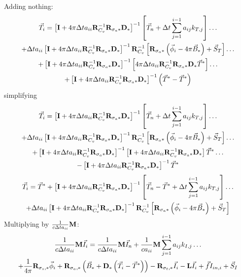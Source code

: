 %
%
Adding nothing:
\begin{multline*}
\vec{T}_i = \left[ \mathbf{I}  + 4\pi\Delta t a_{ii}\mathbf{R}_{C_v}^{-1}\mathbf{R}_{\sigma_a*} \mathbf{D}_*   \right]^{-1}\left[\vec{T}_n + \Delta t \sum_{j=1}^{i-1}{a_{ij} k_{T,j}   }\right] \dots \\
+ \Delta t a_{ii}\left[ \mathbf{I} + 4\pi\Delta t a_{ii}\mathbf{R}_{C_v}^{-1}\mathbf{R}_{\sigma_a*} \mathbf{D}_*   \right]^{-1}
\mathbf{R}_{C_v}^{-1}\left[\mathbf{R}_{\sigma_a*} \left(\vec{\phi}_i -  4\pi\vec{B}_*\right) + \vec{S}_T \right]\dots \\
+\left[ \mathbf{I} + 4\pi\Delta t a_{ii}\mathbf{R}_{C_v}^{-1}\mathbf{R}_{\sigma_a*} \mathbf{D}_*   \right]^{-1}
\left[ 4\pi\Delta t a_{ii} \mathbf{R}_{C_v}^{-1}\mathbf{R}_{\sigma_a*}   \mathbf{D}_* \vec{T}^* \right]\dots \\
+ \left[ \mathbf{I}  + 4\pi\Delta t a_{ii}\mathbf{R}_{C_v}^{-1}\mathbf{R}_{\sigma_a*} \mathbf{D}_*   \right]^{-1} \left( \vec{T}^* - \vec{T}^*\right)
\end{multline*}
%
%
simplifying
\begin{multline*}
\vec{T}_i = \left[ \mathbf{I}  + 4\pi\Delta t a_{ii}\mathbf{R}_{C_v}^{-1}\mathbf{R}_{\sigma_a*} \mathbf{D}_*   \right]^{-1}\left[\vec{T}_n + \Delta t \sum_{j=1}^{i-1}{a_{ij} k_{T,j}   }\right] \dots \\
+ \Delta t a_{ii}\left[ \mathbf{I}  + 4\pi\Delta t a_{ii}\mathbf{R}_{C_v}^{-1}\mathbf{R}_{\sigma_a*} \mathbf{D}_*   \right]^{-1}
\mathbf{R}_{C_v}^{-1}\left[\mathbf{R}_{\sigma_a*}\left(\vec{\phi}_i - 4\pi\vec{B}_*\right) + \vec{S}_T \right]\dots \\
+\left[ \mathbf{I} + 4\pi\Delta t a_{ii}\mathbf{R}_{C_v}^{-1}\mathbf{R}_{\sigma_a*} \mathbf{D}_*   \right]^{-1}
\left[  \mathbf{I}  + 4\pi\Delta t a_{ii} \mathbf{R}_{C_v}^{-1}\mathbf{R}_{\sigma_a*}  \mathbf{D}_* \right]\vec{T}^* \dots \\
- \left[ \mathbf{I}  + 4\pi\Delta t a_{ii}\mathbf{R}_{C_v}^{-1}\mathbf{R}_{\sigma_a*} \mathbf{D}_*   \right]^{-1} \vec{T}^* 
\end{multline*}
%
%
%
\begin{multline}
\vec{T}_i = \vec{T}^*   + \left[ \mathbf{I} + 4\pi\Delta t a_{ii}\mathbf{R}_{C_v}^{-1}\mathbf{R}_{\sigma_a*} \mathbf{D}_*   \right]^{-1}\left[\vec{T}_n -\vec{T}^* + \Delta t \sum_{j=1}^{i-1}{a_{ij} k_{T,j}   }\right] \dots \\
+ \Delta t a_{ii}\left[ \mathbf{I}  + 4\pi\Delta t a_{ii}\mathbf{R}_{C_v}^{-1}\mathbf{R}_{\sigma_a*} \mathbf{D}_*   \right]^{-1}\mathbf{R}_{C_v}^{-1}
\left[ \mathbf{R}_{\sigma_a*}\left(\vec{\phi}_i - 4\pi\vec{B}_*  \right) + \vec{S}_T \right]
\label{eq:Ti_iso}
\end{multline}
%
Multiplying  by $\frac{1}{c\Delta t a_{ii}} \mathbf M$:
\begin{multline}
\frac{1}{c\Delta t a_{ii}} \mathbf M\vec{I}_i = \frac{1}{c\Delta t a_{ii}} \mathbf M\vec{I}_n + \frac{1}{c a_{ii}}  \mathbf M \sum_{j=1}^{i-1}{a_{ij} k_{I,j}   } \dots \\
+ 
\frac{1}{4\pi}\mathbf{R}_{\sigma_s,*}\vec{\phi}_i + 
\mathbf{R}_{\sigma_a,*}\left(\vec{B}_* +  \mathbf{D}_* \left(\vec{T}_i -\vec{T}^*  \right)   \right)- \mathbf{R}_{\sigma_t,*} \vec{I}_i - \mathbf{L}\vec{I}_i + \vec{f}I_{in,i} + \vec{S}_I
\label{eq:kIi_second}
\end{multline}
